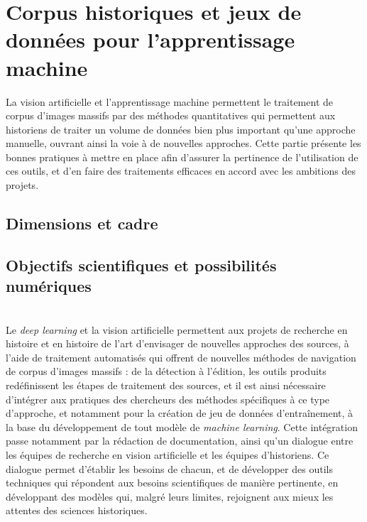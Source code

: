 \documentclass[a4paper,12pt,twoside]{book}
\newcommand{\dl}{\textit{deep learning}\xspace}
\newcommand{\ml}{\textit{machine learning}\xspace}
\newcommand{\clearemptydoublepage}{\newpage{\pagestyle{empty}\cleardoublepage}}
\begin{document}
        \chapter[Corpus historiques et jeux de données]{Corpus historiques et jeux de données pour l’apprentissage machine}
        La vision artificielle et l'apprentissage machine permettent le traitement de corpus d'images massifs par des méthodes quantitatives qui permettent aux historiens de traiter un volume de données bien plus important qu'une approche manuelle, ouvrant ainsi la voie à de nouvelles approches. Cette partie présente les bonnes pratiques à mettre en place afin d'assurer la pertinence de l'utilisation de ces outils, et d'en faire des traitements efficaces en accord avec les ambitions des projets.
    
            \section{Dimensions et cadre}
                
        
            \section{\label{objectifsPossibilites}Objectifs scientifiques et possibilités numériques}
                
        	\\
        
        Le \dl et la vision artificielle permettent aux projets de recherche en histoire et en histoire de l'art d'envisager de nouvelles approches des sources, à l'aide de traitement automatisés qui offrent de nouvelles méthodes de navigation de corpus d'images massifs : de la détection à l'édition, les outils produits redéfinissent les étapes de traitement des sources, et il est ainsi nécessaire d'intégrer aux pratiques des chercheurs des méthodes spécifiques à ce type d'approche, et notamment pour la création de jeu de données d'entraînement, à la base du développement de tout modèle de \ml. Cette intégration passe notamment par la rédaction de documentation, ainsi qu'un dialogue entre les équipes de recherche en vision artificielle et les équipes d'historiens. Ce dialogue permet d'établir les besoins de chacun, et de développer des outils techniques qui répondent aux besoins scientifiques de manière pertinente, en développant des modèles qui, malgré leurs limites, rejoignent aux mieux les attentes des sciences historiques.
        \clearemptydoublepage
\end{document}
